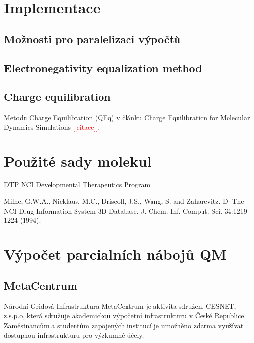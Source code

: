 \documentclass[
  color, %
  table, %
  lof,   %
  lot,   %
]{fithesis3}
\newcommand\fixme[1]{\textcolor{red}{[[#1]]}}
\begin{document}


\chapter{Implementace}

\section{Možnosti pro paralelizaci výpočtů}



\section{Electronegativity equalization method}

\section{Charge equilibration}

Metodu Charge Equilibration (QEq) v článku Charge Equilibration for Molecular Dynamics Simulations \fixme{citace}.

\chapter{Použité sady molekul}

DTP NCI Developmental Therapeutics Program


Milne, G.W.A., Nicklaus, M.C., Driscoll, J.S., Wang, S. and Zaharevitz. D. The NCI Drug Information System 3D Database. J. Chem. Inf. Comput. Sci. 34:1219-1224 (1994).

\chapter{Výpočet parcialních nábojů QM}

\section{MetaCentrum}

Národní Gridová Infrastruktura MetaCentrum je aktivita sdružení CESNET, z.s.p.o, která sdružuje akademickou výpočetní infrastrukturu v České Republice. Zaměstnancům a studentům zapojených institucí je umožněno zdarma využívat dostupnou infrastrukturu pro výzkumné účely.
\end{document}
